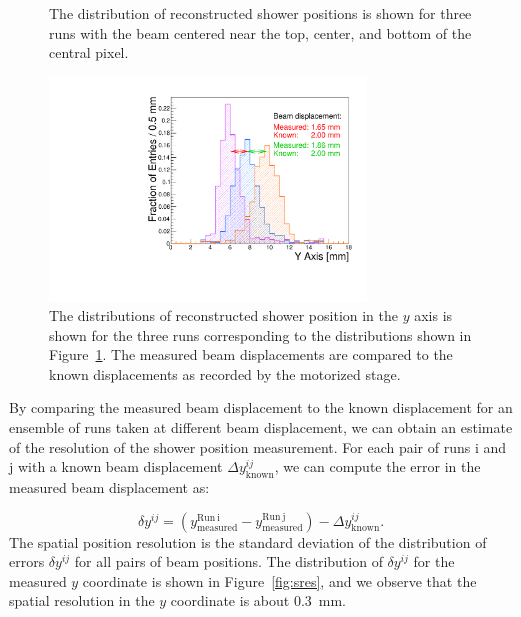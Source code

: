 \documentclass[12pt]{article}
\begin{document}
{\begin{figure}[htbp]
	\caption{The distribution of reconstructed shower positions is shown
	for three runs with the beam centered near the top, center, and bottom of the
	central pixel. }
	\label{fig:EMShowerPositions}
\end{figure}

\begin{figure}[htbp]
	\centering
	\includegraphics[width=0.75\textwidth]{Images/centers/superimposed.pdf}
	\caption{ The distributions of reconstructed shower position in the $y$ axis is
shown for the three runs corresponding to the distributions shown in
Figure~\ref{fig:EMShowerPositions}. The measured beam displacements are
compared to the known displacements as recorded by the motorized stage. }
	\label{fig:EMShowerYPositionComparison}
\end{figure}

By comparing the measured beam displacement to the known displacement for an
ensemble of runs taken at different beam displacement, we can obtain an estimate
of the resolution of the shower position measurement. For each pair of runs i and j with 
a known beam displacement $\Delta y^{ij}_{\mathrm{known}}$, we can compute the 
error in the measured beam displacement as:

\begin{equation}
\delta y^{ij} = (y^{\mathrm{Run\ i}}_\mathrm{measured}-y^{\mathrm{Run\ j}}_\mathrm{measured}) - \Delta 
y^{ij}_\mathrm{known}.
\end{equation}
The spatial position resolution is the standard deviation of the distribution of  
errors $\delta y^{ij}$ for all pairs of beam positions. The distribution of $\delta y^{ij}$
for the measured $y$ coordinate is shown in Figure~\ref{fig:sres}, and we 
observe that the spatial resolution in the $y$ coordinate is about $0.3$~mm. 

}
\end{document}

